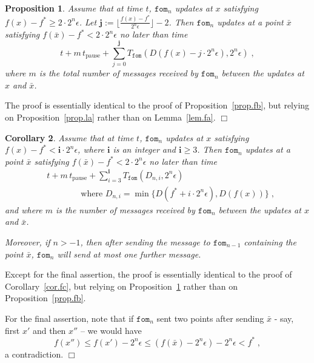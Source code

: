 \documentclass[reqno, 11pt]{amsart}
\newtheorem{prop}{Proposition}[section]
\newtheorem{cor}[prop]{Corollary}
\numberwithin{equation}{section}
\newcommand{\fom}{\mathtt{fom}}
\newcommand{\tpause}{t_{\mathrm{pause}}}
\begin{document}
 \begin{prop}  \label{prop.lb}  
 Assume that at time $ t $, $ \fom_n $ updates at $ x $ satisfying $ f(x) - f^* \geq 2 \cdot 2^n \epsilon $. Let $ \mathbf{j}  := \lfloor \frac{ f(x) - f^* }{ 2^n \epsilon } \rfloor - 2 $. Then $ \fom_n $ updates at a point $ \bar{x} $ satisfying $ f( \bar{x}) - f^* < 2 \cdot 2^n \epsilon $ no later than time
\[  
            t + m \, \tpause + \sum_{j=0}^{\mathbf{j}}   T_{\fom}( D( f(x) - j \cdot 2^n \epsilon), 2^n \epsilon) \; ,
\]  
where $ m $ is the total number of messages received by $ \fom_n $ between the updates at $ x $ and  $ \bar{x} $. 
\end{prop} 
 The proof is essentially identical to the proof of Proposition~\ref{prop.fb}, but relying on Proposition~\ref{prop.la}  rather than on Lemma~\ref{lem.fa}.  \hfill $ \Box $ 

 
 \begin{cor}  \label{cor.lc} 
Assume that at time $ t $, $ \fom_n $ updates at $ x $ satisfying $ 
 f(x) - f^* < \mathbf{i}  \cdot 2^n \epsilon $,
where $ \mathbf{i}  $ is an integer and $ \mathbf{i} \geq 3 $. Then $ \fom_n $ updates at a point $ \bar{x} $ satisfying  $ f( \bar{x}) - f^* < 2 \cdot 2^n \epsilon $ no later than time
\begin{align}
  & t + m \, \tpause + \sum_{i=3}^{ \mathbf{i}} T_{\fom}(D_{n,i}, 2^n \epsilon) \nonumber \\
   & \qquad  \qquad  \textrm{where} \, \, D_{n,i} = \min \{ D(f^* + i \cdot 2^n \epsilon), D(f(x) ) \} \; ,  \label{eqn.le} 
   \end{align}
and where $ m $ is the number of messages received by $ \fom_n $ between the updates at $ x $ and $ \bar{x} $. 

Moreover, if $ n > -1 $, then after sending the message to $ \fom_{n-1} $ containing the point $ \bar{x} $, $ \fom_n $ will send at most one further message.   
 \end{cor}
  Except for the final assertion, the proof is essentially identical to the proof of Corollary~\ref{cor.fc}, but relying on Proposition~\ref{prop.lb}  rather than on Proposition~\ref{prop.fb}.
 
For the final assertion, note that if $ \fom_n $ sent two points after sending $ \bar{x} $ - say, first $ x' $ and then $ x'' $ -- we would have
\[   f(x'') \leq f(x') - 2^n \epsilon \leq (f( \bar{x}) - 2^n \epsilon) - 2^n \epsilon < f^* \; , \]
a contradiction.  \hfill $ \Box $
\end{document}
